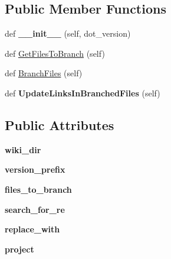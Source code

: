 \subsection*{Public Member Functions}
\begin{DoxyCompactItemize}
\item 
\mbox{\label{classrelease__docs_1_1_wiki_brancher_a344b32e2b65f0e8bab9fbf1e670d33fd}} 
def {\bfseries \+\_\+\+\_\+init\+\_\+\+\_\+} (self, dot\+\_\+version)
\item 
def \mbox{\hyperlink{classrelease__docs_1_1_wiki_brancher_a05fc4282f501fb0210ecb33fd1d209a6}{Get\+Files\+To\+Branch}} (self)
\item 
def \mbox{\hyperlink{classrelease__docs_1_1_wiki_brancher_a5ef284f7e1742f465ecd0c14d2667327}{Branch\+Files}} (self)
\item 
\mbox{\label{classrelease__docs_1_1_wiki_brancher_aa0bc4b1b78426fe7a8496d570b540f1d}} 
def {\bfseries Update\+Links\+In\+Branched\+Files} (self)
\end{DoxyCompactItemize}
\subsection*{Public Attributes}
\begin{DoxyCompactItemize}
\item 
\mbox{\label{classrelease__docs_1_1_wiki_brancher_ad86478c9538ac0bf3916f67eb5da2910}} 
{\bfseries wiki\+\_\+dir}
\item 
\mbox{\label{classrelease__docs_1_1_wiki_brancher_aae330aeef850b105795c5d75727448ba}} 
{\bfseries version\+\_\+prefix}
\item 
\mbox{\label{classrelease__docs_1_1_wiki_brancher_a938c78ba6e8adfb6af039dd500ac6466}} 
{\bfseries files\+\_\+to\+\_\+branch}
\item 
\mbox{\label{classrelease__docs_1_1_wiki_brancher_a029ce9007fefd6ac5f13bacdedb29af5}} 
{\bfseries search\+\_\+for\+\_\+re}
\item 
\mbox{\label{classrelease__docs_1_1_wiki_brancher_aa33d991e629cc94fbfefe4f8569e283e}} 
{\bfseries replace\+\_\+with}
\item 
\mbox{\label{classrelease__docs_1_1_wiki_brancher_a4ac9c796f95690cca04049b557055443}} 
{\bfseries project}
\end{DoxyCompactItemize}


